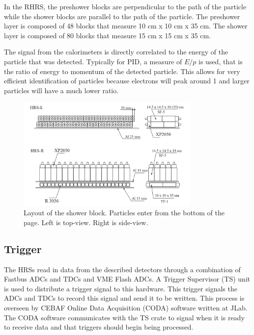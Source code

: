 In the RHRS, the preshower blocks are perpendicular to the path of the particle while the shower blocks are parallel to the path of the particle. The preshower layer is composed of 48 blocks that measure 10 cm x 10 cm x 35 cm. The shower layer is composed of 80 blocks that measure 15 cm x 15 cm x 35 cm.

The signal from the calorimeters is directly correlated to the energy of the particle that was detected. Typically for PID, a measure of $E/p$ is used, that is the ratio of energy to momentum of the detected particle. This allows for very efficient identification of particles because electrons will peak around 1 and larger particles will have a much lower ratio.

\begin{figure}
\begin{center}
	\includegraphics[width=0.8\textwidth]{./setup/fig/shower_layout.png}
	\caption{Layout of the shower block. Particles enter from the bottom of the page. Left is top-view. Right is side-view. \cite{HANIM}}
	\label{shower_layout}
\end{center}
\end{figure}

\subsection{Trigger}

The HRSs read in data from the described detectors through a combination of Fastbus ADCs and TDCs and VME Flash ADCs. A Trigger Supervisor (TS) unit is used to distribute a trigger signal to this hardware. This trigger signals the ADCs and TDCs to record this signal and send it to be written. This process is overseen by CEBAF Online Data Acquisition (CODA) software written at JLab. The CODA software communicates with the TS crate to signal when it is ready to receive data and that triggers should begin being processed.

